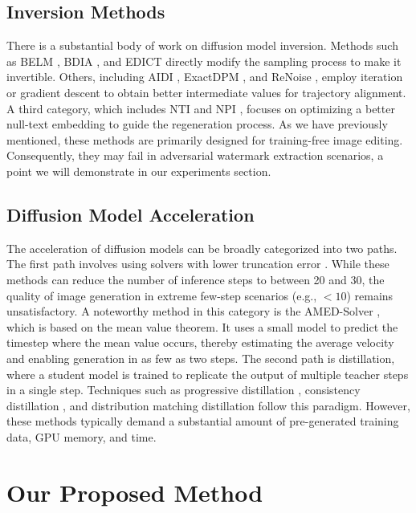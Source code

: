 \documentclass{article}
\begin{document}
\subsection{Inversion Methods}
\label{sec:inv_methods}
There is a substantial body of work on diffusion model inversion. Methods such as BELM \citep{belm2024}, BDIA \citep{bdia2024}, and EDICT \citep{edict2023} directly modify the sampling process to make it invertible. Others, including AIDI \citep{aidi2023}, ExactDPM \citep{exactdpm2024}, and ReNoise \citep{renoise2024}, employ iteration or gradient descent to obtain better intermediate values for trajectory alignment. A third category, which includes NTI \citep{nti2023} and NPI \citep{npi2025}, focuses on optimizing a better null-text embedding to guide the regeneration process. As we have previously mentioned, these methods are primarily designed for training-free image editing. Consequently, they may fail in adversarial watermark extraction scenarios, a point we will demonstrate in our experiments section.

\subsection{Diffusion Model Acceleration}

The acceleration of diffusion models can be broadly categorized into two paths. The first path involves using solvers with lower truncation error \citep{dpm_2022, dpmpp2022, deis2022}. While these methods can reduce the number of inference steps to between 20 and 30, the quality of image generation in extreme few-step scenarios (e.g., $<10$) remains unsatisfactory. A noteworthy method in this category is the AMED-Solver \citep{amed2024}, which is based on the mean value theorem. It uses a small model to predict the timestep where the mean value occurs, thereby estimating the average velocity and enabling generation in as few as two steps.
The second path is distillation, where a student model is trained to replicate the output of multiple teacher steps in a single step. Techniques such as progressive distillation \citep{pd2022}, consistency distillation \citep{cm2023}, and distribution matching distillation \citep{dmd2024, dmd2_2024} follow this paradigm. However, these methods typically demand a substantial amount of pre-generated training data, GPU memory, and time.

\section{Our Proposed Method}
\end{document}
